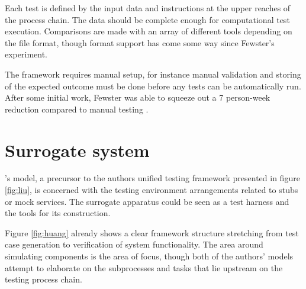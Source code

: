 \documentclass[12pt,a4paper,oneside,pdftex]{report}
\begin{document}
Each test is defined by the input data and instructions at the upper reaches of the process chain. The data should be complete enough for computational test execution. Comparisons are made with an array of different tools depending on the file format, though format support has come some way since Fewster's experiment.

The framework requires manual setup, for instance manual validation and storing of the expected outcome must be done before any tests can be automatically run. After some initial work, Fewster was able to squeeze out a 7 person-week reduction compared to manual testing \citep{fewster1999software}.

\section{Surrogate system}

\citeauthor{huang2008surrogate}'s \citeyearpar{huang2008surrogate} model, a precursor to the authors unified testing framework presented in figure \ref{fig:liu}, is concerned with the testing environment arrangements related to stubs or mock services. The surrogate apparatus could be seen as a test harness and the tools for its construction. 

Figure \ref{fig:huang} already shows a clear framework structure stretching from test case generation to verification of system functionality. The area around simulating components is the area of focus, though both of the authors' models attempt to elaborate on the subprocesses and tasks that lie upstream on the testing process chain. \citep{huang2008surrogate}
\end{document}

